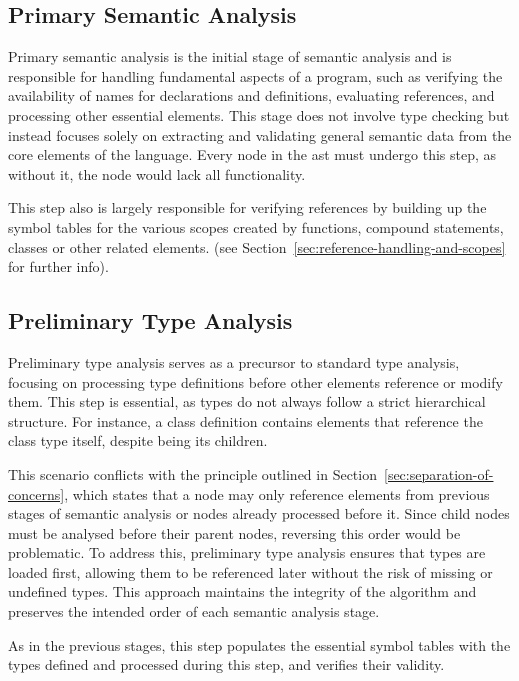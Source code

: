 \subsection{Primary Semantic Analysis}
\label{sec:primary-semantic-analysis}

Primary semantic analysis is the initial stage of semantic analysis and is responsible for handling fundamental aspects of a program, such as verifying the availability of names for declarations and definitions, evaluating references, and processing other essential elements. This stage does not involve type checking but instead focuses solely on extracting and validating general semantic data from the core elements of the language. Every node in the \acrshort{ast} must undergo this step, as without it, the node would lack all functionality.

This step also is largely responsible for verifying references by building up the symbol tables for the various scopes created by functions, compound statements, classes or other related elements. (see Section~\ref{sec:reference-handling-and-scopes} for further info). 

\subsection{Preliminary Type Analysis}
\label{sec:preliminary-type-analysis}

Preliminary type analysis serves as a precursor to standard type analysis, focusing on processing type definitions before other elements reference or modify them. This step is essential, as types do not always follow a strict hierarchical structure. For instance, a class definition contains elements that reference the class type itself, despite being its children.

This scenario conflicts with the principle outlined in Section~\ref{sec:separation-of-concerns}, which states that a node may only reference elements from previous stages of semantic analysis or nodes already processed before it. Since child nodes must be analysed before their parent nodes, reversing this order would be problematic. To address this, preliminary type analysis ensures that types are loaded first, allowing them to be referenced later without the risk of missing or undefined types. This approach maintains the integrity of the algorithm and preserves the intended order of each semantic analysis stage.

As in the previous stages, this step populates the essential symbol tables with the types defined and processed during this step, and verifies their validity.

